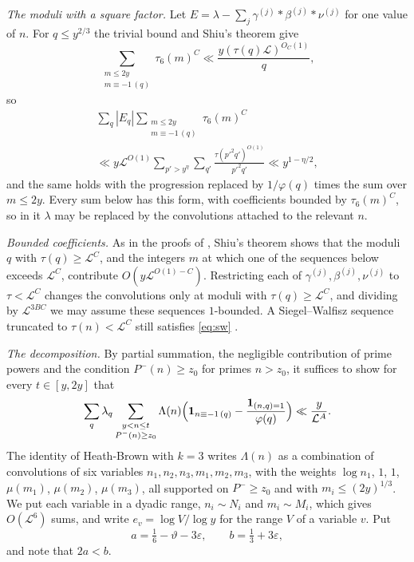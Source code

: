 \documentclass[aps,prd,twocolumn,superscriptaddress,nofootinbib,longbibliography,floatfix,showkeys,nobalancelastpage,amsmath,amssymb,10pt]{revtex4-2}
\theoremstyle{plain}
\theoremstyle{definition}
\theoremstyle{plain}
\newcommand{\eps}{\varepsilon}
\newcommand{\one}{\mathbf{1}}
\begin{document}
\emph{The moduli with a square factor.} Let $E=\lambda-\sum_j\gamma^{(j)}*\beta^{(j)}*\nu^{(j)}$ for one value of $n$. For $q\le y^{2/3}$ the trivial bound and Shiu's theorem \cite[Lemma~6.1]{May2} give
\[
\sum_{\substack{m\le2y\\m\equiv-1\,(q)}}\tau_6(m)^{C}\ll\frac{y(\tau(q)\mathcal L)^{O_C(1)}}q,
\]
so
\begin{multline*}
\sum_q|E_q|\sum_{\substack{m\le2y\\m\equiv-1\,(q)}}\tau_6(m)^C\\
\ll y\mathcal L^{O(1)}\sum_{p'>y^\eta}\sum_{q'}\frac{\tau(p'^2q')^{O(1)}}{p'^2q'}\ll y^{1-\eta/2},
\end{multline*}
and the same holds with the progression replaced by $1/\varphi(q)$ times the sum over $m\le2y$. Every sum below has this form, with coefficients bounded by $\tau_6(m)^C$, so in it $\lambda$ may be replaced by the convolutions attached to the relevant $n$.

\emph{Bounded coefficients.} As in the proofs of \cite[Propositions~5.1 and~5.2]{May2}, Shiu's theorem shows that the moduli $q$ with $\tau(q)\ge\mathcal L^C$, and the integers $m$ at which one of the sequences below exceeds $\mathcal L^C$, contribute $O(y\mathcal L^{O(1)-C})$. Restricting each of $\gamma^{(j)},\beta^{(j)},\nu^{(j)}$ to $\tau<\mathcal L^C$ changes the convolutions only at moduli with $\tau(q)\ge\mathcal L^C$, and dividing by $\mathcal L^{3BC}$ we may assume these sequences $1$-bounded. A Siegel--Walfisz sequence truncated to $\tau(n)<\mathcal L^C$ still satisfies \eqref{eq:sw} \cite[Lemma~6.5]{May2}.

\emph{The decomposition.} By partial summation, the negligible contribution of prime powers and the condition $P^-(n)\ge z_0$ for primes $n>z_0$, it suffices to show for every $t\in[y,2y]$ that
\[
\sum_q\lambda_q\sum_{\substack{y<n\le t\\P^-(n)\ge z_0}}\Lambda(n)\Bigl(\one_{n\equiv-1\,(q)}-\frac{\one_{(n,q)=1}}{\varphi(q)}\Bigr)\ll\frac y{\mathcal L^A}.
\]
The identity of Heath-Brown with $k=3$ \cite[Lemma~5.3]{May2} writes $\Lambda(n)$ as a combination of convolutions of six variables $n_1,n_2,n_3,m_1,m_2,m_3$, with the weights $\log n_1$, $1$, $1$, $\mu(m_1)$, $\mu(m_2)$, $\mu(m_3)$, all supported on $P^-\ge z_0$ and with $m_i\le(2y)^{1/3}$. We put each variable in a dyadic range, $n_i\sim N_i$ and $m_i\sim M_i$, which gives $O(\mathcal L^6)$ sums, and write $e_v=\log V/\log y$ for the range $V$ of a variable $v$. Put
\[
a=\tfrac16-\vartheta-3\eps,\qquad b=\tfrac13+3\eps,
\]
and note that $2a<b$.
\end{document}
